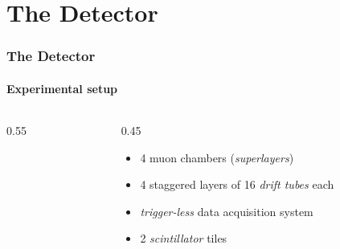 \documentclass{beamer}
\begin{document}
	\section{The Detector}

	\begin{frame}
		\frametitle{The Detector}
		\framesubtitle{Experimental setup}

		\begin{columns}

			\begin{column}{0.55\framewidth}
				\vspace{-2.5em}
				\begin{center}
					
				\end{center}


			\end{column}

			\begin{column}{0.45\framewidth}
				\vspace{-5.5em}
				\begin{itemize}
					\setlength{\itemsep}{1em}
					\item 4 muon chambers (\alert{\textit{superlayers}})
					\item 4 staggered layers of 16 \alert{\textit{drift tubes}} each
					\item \alert{\textit{trigger-less}} data acquisition system
					\item 2 \alert{\textit{scintillator}} tiles		
				\end{itemize}
			\end{column}
			
		\end{columns}

		
		
	\end{frame}

\end{document}
